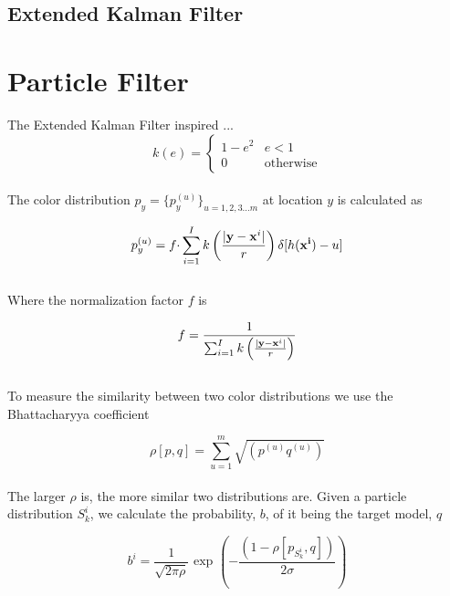 \documentclass[11pt]{article}
\begin{document}
\subsection{Extended Kalman Filter}



\section{Particle Filter}
\label{sec:particlefilter}

The Extended Kalman Filter inspired ...  \\

\begin{equation}
k(e) = \begin{cases}
 1 - e^2  & \text{$e < 1$} \\
 0            & \text{otherwise}
\end{cases}
\label{eq:kdist}
\end{equation} \\

The color distribution $p_y = \{p_y^{(u)}\}_{u = 1,2,3 \dots m}$ at location $y$ is calculated as

\begin{equation}
p_y^{(u)} = f \cdotp \sum^I_{i=1} k \left ( \frac{| {\bf y} - {\bf x}^i|}{r} \right ) \delta [h({\bf x^i})-u]
\label{eq:cdist}
\end{equation} \\

Where the normalization factor $f$ is

\begin{equation}
f = \frac{1}{\sum^I_{i=1} k \left ( \frac{| {\bf y} - {\bf x}^i|}{r} \right )}
\label{eq:normfact}
\end{equation} \\

To measure the similarity between two color distributions we use the Bhattacharyya coefficient

\begin{equation}
\rho[p,q] = \sum^m_{u=1} \sqrt{ (p^{(u)} q^{(u)}) } 
\label{eq:bcoeff}
\end{equation} \\

The larger $\rho$ is, the more similar two distributions are. Given a particle distribution $S_k^i$, we calculate the probability, $b$, of it being the target model, $q$

\begin{equation}
b^i = \frac{1}{\sqrt{2\pi\rho}} \text{ exp } \left ( - \frac{(1-\rho[p_{S_k^i},q])}{2\sigma} \right )
\label{eq:bprob}
\end{equation} \\
\end{document}
